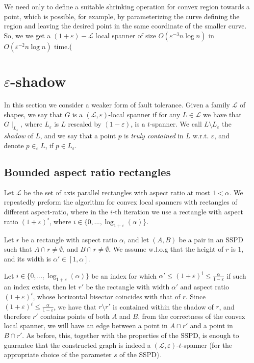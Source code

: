 \documentclass{article}
\newcommand{\eps}{\varepsilon}
\newcommand{\C}{\mathcal{C}}
\newcommand{\LL}{\mathcal{L}}
\newcommand{\DG}{\mathcal{DG}}
\begin{document}
	We need only to define a suitable shrinking operation for convex region towards a point, which is possible, for example, by parameterizing the curve defining the region and leaving the desired point in the same coordinate of the smaller curve. So, we we get a $(1+\eps)-\LL$ local spanner of size $O(\eps^{-3}n\log n)$ in $O(\eps^{-2}n\log n)$ time.(
	

	
	\section{$\eps$-shadow}
	
	In this section we consider a weaker form of fault tolerance. Given a family $\LL$ of shapes, we say that $G$ is a $(\LL,\eps)$-local spanner if for any $L\in\LL$ we have that $G\mid_{L_{\eps}}$, where $L_{\eps}$ is $L$ rescaled by $(1-\eps)$, is a $t$-spanner. We call $L\setminus L_{\eps}$ the \emph{shadow} of $L$, and we say that a point $p$ is \emph{truly contained} in $L$ w.r.t. $\eps$, and denote $p\in_{\eps} L$, if $p\in L_{\eps}$. 
	
	\subsection{Bounded aspect ratio rectangles}
	Let $\LL$ be the set of axis parallel rectangles with aspect ratio at most $1<\alpha$. We repeatedly preform the algorithm for convex local spanners with rectangles of different aspect-ratio, where in the $i$-th iteration we use a rectangle with aspect ratio $\left(1+\eps\right)^i$, where $i\in\{0,...,\log_{1+\eps}(\alpha)\}$. 
	
	Let $r$ be a rectangle with aspect ratio $\alpha$, and let $(A,B)$ be a pair in an SSPD such that $A\cap r\neq \emptyset$, and $B\cap r\neq \emptyset$. We assume w.l.o.g that the height of $r$ is 1, and its width is $\alpha'\in [1,\alpha]$.

	Let $i\in \{0,...,\log_{1+\eps}(\alpha)\}$ be an index for which $\alpha' \leq (1+\eps)^i \leq \frac{\alpha}{1-\eps}$ if such an index exists, then let $r'$ be the rectangle with width $\alpha'$ and aspect ratio $(1+\eps)^i$, whose horizontal bisector coincides with that of $r$. Since $(1+\eps)^i \leq \frac{\alpha}{1-\eps}$, we have that $r\setminus r'$ is contained within the shadow of $r$, and therefore $r'$ contains points of both $A$ and $B$, from the correctness of the convex local spanner, we will have an edge between a point in $A\cap r'$ and a point in $B\cap r'$. As before, this, together with the properties of the SSPD, is enough to guarantee that the constructed graph is indeed a $(\LL, \eps)$-$t$-spanner (for the appropriate choice of the parameter $s$ of the SSPD).
	
\end{document}
